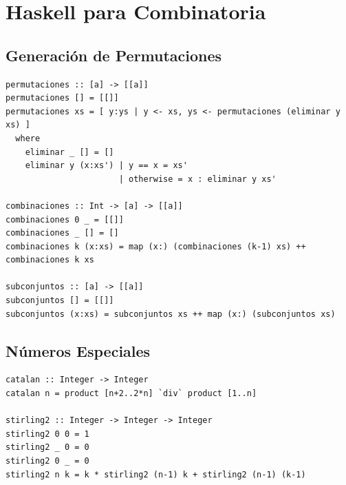 \chapter{Haskell para Combinatoria}

\section{Generación de Permutaciones}

\begin{lstlisting}[caption={Permutaciones en Haskell}]
permutaciones :: [a] -> [[a]]
permutaciones [] = [[]]
permutaciones xs = [ y:ys | y <- xs, ys <- permutaciones (eliminar y xs) ]
  where
    eliminar _ [] = []
    eliminar y (x:xs') | y == x = xs'
                       | otherwise = x : eliminar y xs'

combinaciones :: Int -> [a] -> [[a]]
combinaciones 0 _ = [[]]
combinaciones _ [] = []
combinaciones k (x:xs) = map (x:) (combinaciones (k-1) xs) ++ combinaciones k xs

subconjuntos :: [a] -> [[a]]
subconjuntos [] = [[]]
subconjuntos (x:xs) = subconjuntos xs ++ map (x:) (subconjuntos xs)
\end{lstlisting}

\section{Números Especiales}

\begin{lstlisting}
catalan :: Integer -> Integer
catalan n = product [n+2..2*n] `div` product [1..n]

stirling2 :: Integer -> Integer -> Integer
stirling2 0 0 = 1
stirling2 _ 0 = 0
stirling2 0 _ = 0
stirling2 n k = k * stirling2 (n-1) k + stirling2 (n-1) (k-1)
\end{lstlisting}